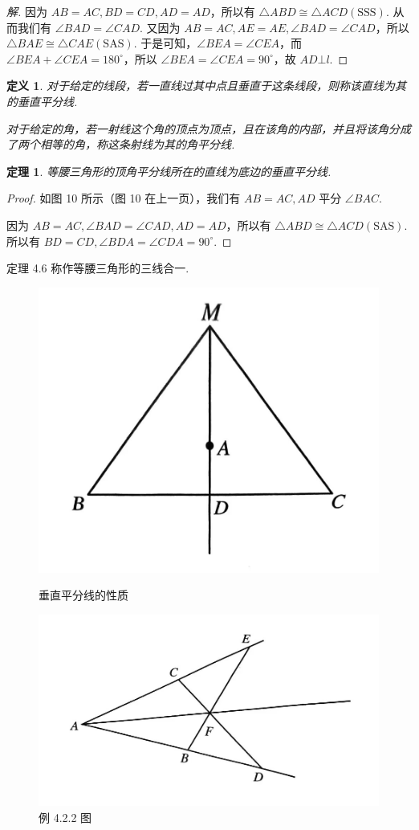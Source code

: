 \documentclass[a4paper]{article}
\newtheorem{theorem}{定理}[section]
\newtheorem{definition}{定义}[section]
\begin{document}
\begin{proof}[解]
    因为 $AB=AC,BD=CD,AD=AD$，所以有 $\triangle ABD\cong \triangle ACD(\text{SSS})$. 从而我们有 $\angle
    BAD=\angle CAD$. 又因为 $AB=AC,AE=AE,\angle BAD=\angle CAD$，所以 $\triangle BAE\cong \triangle
    CAE(\text{SAS})$. 于是可知，$\angle BEA=\angle CEA$，而 $\angle BEA+\angle CEA = 180^\circ$，所以
    $\angle BEA=\angle CEA=90^\circ$，故 $AD\bot l$.
\end{proof}

\begin{definition}
    对于给定的线段，若一直线过其中点且垂直于这条线段，则称该直线为其的垂直平分线.

    对于给定的角，若一射线这个角的顶点为顶点，且在该角的内部，并且将该角分成了两个相等的角，称这条射线为其的角平分线.
\end{definition}

\begin{theorem}
    等腰三角形的顶角平分线所在的直线为底边的垂直平分线.
\end{theorem}

\begin{proof}
    如图 10 所示（图 10 在上一页），我们有 $AB=AC,AD$ 平分 $\angle BAC$.

    因为 $AB=AC,\angle BAD=\angle CAD,AD=AD$，所以有 $\triangle ABD\cong \triangle ACD(\text{SAS})$.
    所以有 $BD=CD,\angle BDA=\angle CDA=90^\circ$.
\end{proof}

定理 4.6 称作等腰三角形的三线合一.

\begin{figure}[htbp]
    \centering
    \begin{minipage}{0.4\textwidth}
        \centering
        \includegraphics[width=0.5\linewidth]{Pictures/O2-5.jpg}
        \caption{垂直平分线的性质}
    \end{minipage}
    \begin{minipage}{0.4\textwidth}
        \centering
        \includegraphics[width=0.7\linewidth]{Pictures/O-P1.5.jpg}
        \caption{例 4.2.2 图}
    \end{minipage}
\end{figure}
\end{document}

